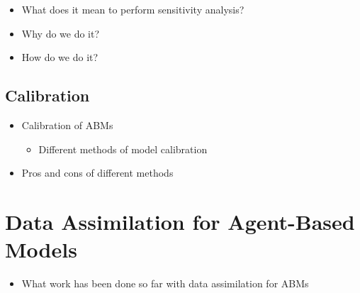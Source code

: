 \documentclass[11pt,a4paper]{article}
\begin{document}
\begin{itemize}
    \item What does it mean to perform sensitivity analysis?
    \item Why do we do it?
    \item How do we do it? \citep{thiele2014facilitating,ten2016sensitivity}
\end{itemize}

\subsection{Calibration}
\label{sub:analysis:calibration}

\begin{itemize}
    \item Calibration of ABMs
        \begin{itemize}
            \item Different methods of model calibration
                \citep{thiele2014facilitating}
        \end{itemize}
    \item Pros and cons of different methods
\end{itemize}

\section{Data Assimilation for Agent-Based Models}
\label{sec:dyn_cal}

\begin{itemize}
    \item What work has been done so far with data assimilation for ABMs
        \citep{ward2016dynamic,wang2015data}
\end{itemize}



\label{bib}
\end{document}
